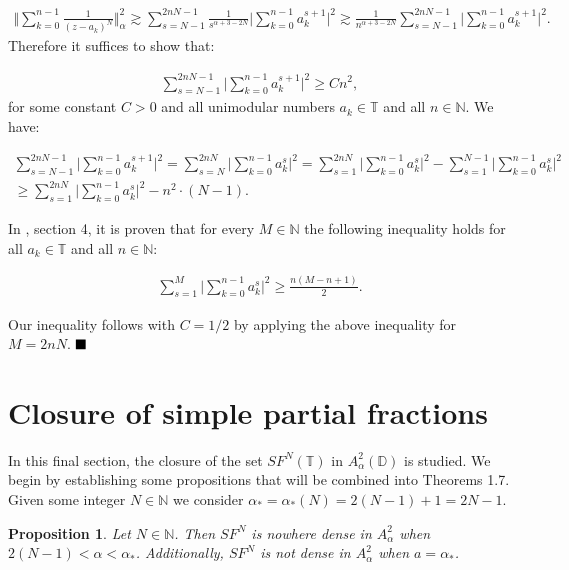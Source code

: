 \documentclass{amsart}[11pt]
\newcommand{\N}{\mathbb{N}} %
\newcommand{\D}{\mathbb{D}} %
\newcommand{\T}{\mathbb{T}} %
\newtheorem{proposition}[theorem]{Proposition}
\theoremstyle{definition}
\begin{document}
\begin{gather*}
\bigg \Vert \sum_{k=0}^{n-1} \frac{1}{(z-a_k)^N} \bigg \Vert_{\alpha}^2 \gtrsim \sum_{s = N-1}^{2nN-1} \frac{1}{s^{ \alpha +3 -2N}} \bigg| \sum_{k=0}^{n-1} a_k^{s+1}\bigg|^2 \gtrsim \frac{1}{n^{\alpha +3 - 2N}}  \sum_{s = N-1}^{2nN-1} \bigg| \sum_{k=0}^{n-1} a_k^{s+1}\bigg|^2.
\end{gather*}
Therefore it suffices to show that:

\begin{gather*}
    \sum_{s=N-1}^{2nN-1} \bigg| \sum_{k=0}^{n-1} a_k^{s+1}\bigg|^2 \geq C n^2,
\end{gather*}
for some constant $C>0$ and all unimodular numbers $a_k \in \T$ and all $n \in \N$. We have:

\begin{gather*}
    \sum_{s=N-1}^{2nN-1} \bigg| \sum_{k=0}^{n-1} a_k^{s+1}\bigg|^2 = \sum_{s=N}^{2nN} \bigg| \sum_{k=0}^{n-1} a_k^s\bigg|^2 = \sum_{s=1}^{2nN} \bigg| \sum_{k=0}^{n-1} a_k^s\bigg|^2  - \sum_{s=1}^{N-1} \bigg| \sum_{k=0}^{n-1} a_k^s\bigg|^2 \\
    \geq  \sum_{s=1}^{2nN} \bigg| \sum_{k=0}^{n-1} a_k^s\bigg|^2 - n^2 \cdot (N-1).
\end{gather*}

In \cite{Abakumov2020}, section 4, it is proven that for every $M \in \N$ the following inequality holds for all $a_k \in \T$ and all $n \in \N$:

\begin{gather*}
    \sum_{s=1}^{M} \bigg| \sum_{k=0}^{n-1} a_k^s\bigg|^2 \geq \frac{n(M - n + 1)}{2}. 
\end{gather*}

Our inequality follows with $C = 1/2$ by applying the above inequality for $M = 2nN$. $\hfill \blacksquare$

\section{Closure of simple partial fractions}

In this final section, the closure of the set $SF^N(\T)$ in $A^2_{\alpha}(\D)$ is studied. We begin by establishing some propositions that will be combined into Theorems 1.7. Given some integer $N \in \N$ we consider $\alpha_{\ast} = \alpha_{\ast}(N) = 2(N-1) + 1 = 2N-1$. 

\begin{proposition}
Let $N \in \N$. Then $SF^N$ is nowhere dense in $A^2_{\alpha}$ when $2(N-1)< \alpha < \alpha_{\ast}$. Additionally, $SF^N$ is not dense in $A^2_{\alpha}$ when $a = \alpha_{\ast}$.
\end{proposition}
\end{document}
